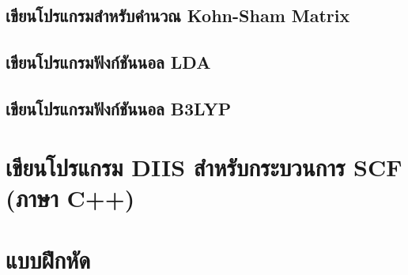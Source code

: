 \subsection{เขียนโปรแกรมสำหรับคำนวณ Kohn-Sham Matrix}

\subsection{เขียนโปรแกรมฟังก์ชันนอล LDA}

\subsection{เขียนโปรแกรมฟังก์ชันนอล B3LYP}

\section{เขียนโปรแกรม DIIS สำหรับกระบวนการ SCF (ภาษา C++)}

\section{แบบฝึกหัด}

